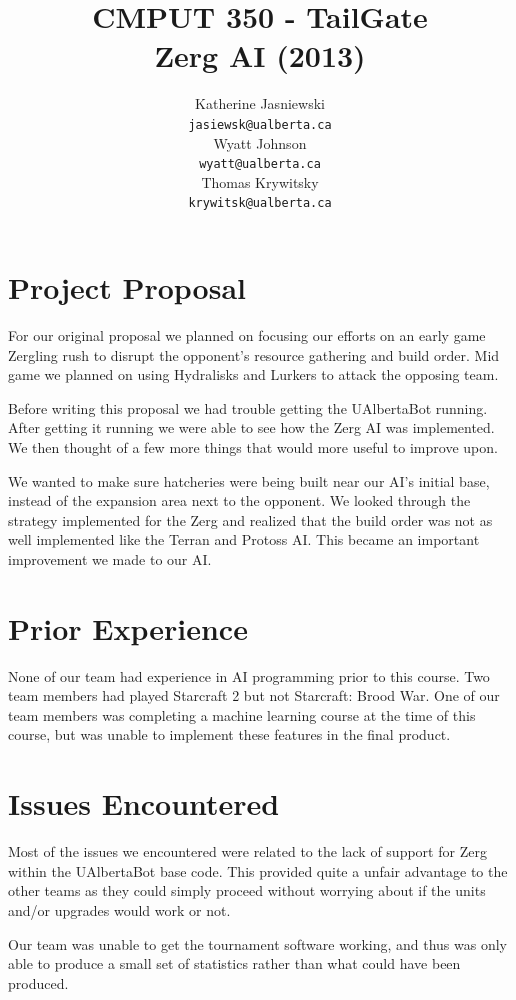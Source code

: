 \documentclass{article}
\title{CMPUT 350 - TailGate\\
Zerg AI (2013)}
\author{
		Katherine Jasniewski\\
		\texttt{jasiewsk@ualberta.ca} \\
	\AND
		Wyatt Johnson\\
		\texttt{wyatt@ualberta.ca} \\
	\AND
		Thomas Krywitsky\\
		\texttt{krywitsk@ualberta.ca} \\
}
\begin{document}
\maketitle


\section{Project Proposal}

For our original proposal we planned on focusing our efforts on an early game Zergling rush to disrupt the opponent's resource gathering and build order. Mid game we planned on using Hydralisks and Lurkers to attack the opposing team.

Before writing this proposal we had trouble getting the UAlbertaBot running. After getting it running we were able to see how the Zerg AI was implemented. We then thought of a few more things that would more useful to improve upon.

We wanted to make sure hatcheries were being built near our AI’s initial base, instead of the expansion area next to the opponent. We looked through the strategy implemented for the Zerg and realized that the build order was not as well implemented like the Terran and Protoss AI. This became an important improvement we made to our AI.

\section{Prior Experience}

None of our team had experience in AI programming prior to this course. Two team members had played Starcraft 2 but not Starcraft: Brood War. One of our team members was completing a machine learning course at the time of this course, but was unable to implement these features in the final product.

\section{Issues Encountered}

Most of the issues we encountered were related to the lack of support for Zerg within the UAlbertaBot base code. This provided quite a unfair advantage to the other teams as they could simply proceed without worrying about if the units and/or upgrades would work or not.

Our team was unable to get the tournament software working, and thus was only able to produce a small set of statistics rather than what could have been produced.
\end{document}
